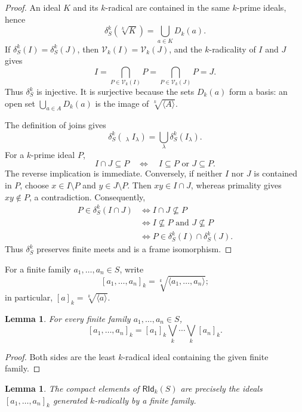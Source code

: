 \documentclass[12pt,leqno]{amsart}
\newcommand{\RIdk}{\mathsf{RId}_{k}}
\newtheorem{lemma}[theorem]{Lemma}
\theoremstyle{definition}
\numberwithin{equation}{section}
\theoremstyle{remark}
\begin{document}
\begin{proof}
An ideal $K$ and its $k$-radical are contained in the same $k$-prime ideals, hence
\[
\delta^k_S(\sqrt[k]{K})=\bigcup_{a\in K}D_k(a).
\]
If \(\delta^k_S(I)=\delta^k_S(J)\), then \(\mathcal V_k(I)=\mathcal V_k(J)\), and the $k$-radicality of $I$ and $J$ gives
\[
I=\bigcap_{P\in\mathcal V_k(I)}P
 =\bigcap_{P\in\mathcal V_k(J)}P=J.
\]
Thus \(\delta^k_S\) is injective. It is surjective because the sets \(D_k(a)\) form a basis: an open set \(\bigcup_{a\in A}D_k(a)\) is the image of \(\sqrt[k]{\langle A\rangle}\).

The definition of joins gives
\[
\delta^k_S\left(\mathop{\bigvee_{\!k}}_\lambda I_\lambda\right)
 =\bigcup_\lambda\delta^k_S(I_\lambda).
\]
For a $k$-prime ideal $P$,
\[
I\cap J\subseteq P
\quad\Longleftrightarrow\quad
I\subseteq P\text{ or }J\subseteq P.
\]
The reverse implication is immediate. Conversely, if neither $I$ nor $J$ is contained in $P$, choose $x\in I\setminus P$ and $y\in J\setminus P$. Then $xy\in I\cap J$, whereas primality gives $xy\notin P$, a contradiction. Consequently,
\begin{align*}
P\in\delta^k_S(I\cap J)
&\Longleftrightarrow I\cap J\nsubseteq P\\
&\Longleftrightarrow I\nsubseteq P\text{ and }J\nsubseteq P\\
&\Longleftrightarrow P\in\delta^k_S(I)\cap\delta^k_S(J).
\end{align*}
Thus \(\delta^k_S\) preserves finite meets and is a frame isomorphism.
\end{proof}

For a finite family \(a_1,\ldots,a_n\in S\), write
\[
[a_1,\ldots,a_n]_k
 =\sqrt[k]{\langle a_1,\ldots,a_n\rangle};
\]
in particular, \([a]_k=\sqrt[k]{\langle a\rangle}\).

\begin{lemma}\label{lem:finite-k-radical-join}
For every finite family \(a_1,\ldots,a_n\in S\),
\[
[a_1,\ldots,a_n]_k
 =[a_1]_k\mathbin{\bigvee_{\!k}}\cdots
  \mathbin{\bigvee_{\!k}}[a_n]_k.
\]
\end{lemma}

\begin{proof}
Both sides are the least $k$-radical ideal containing the given finite family.
\end{proof}

\begin{lemma}\label{lem:k-radical-compacts}
The compact elements of \(\RIdk(S)\) are precisely the ideals
\([a_1,\ldots,a_n]_k\) generated $k$-radically by a finite family.
\end{lemma}
\end{document}
